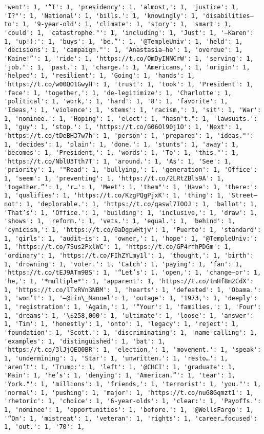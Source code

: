 \documentclass[11pt]{article}
\begin{document}
\begin{Verbatim}[commandchars=\\\{\}]
'went': 1, '“I': 1, 'presidency': 1, 'almost,': 1, 'justice': 1, 'I?"': 1, 'National': 1, 'bills.': 1, 'knowingly': 1, 'disabilities—to': 1, '9-year-old': 1, 'climate': 1, 'story': 1, 'smart': 1, 'could': 1, 'catastrophe."': 1, 'including': 1, 'Just': 1, '—Karen': 1, 'up!):': 1, 'buys': 1, 'be.”': 1, '@TempleUniv': 1, 'held': 1, 'decisions': 1, 'campaign."': 1, 'Anastasia—he': 1, 'overdue': 1, 'Kaine!”': 1, 'ride': 1, 'https://t.co/OmDyINNCrW': 1, 'serving': 1, 'job."': 1, 'past.': 1, 'charge.': 1, 'Americans,': 1, 'origin': 1, 'helped': 1, 'resilient': 1, 'Going': 1, 'hands': 1, 'https://t.co/w00QO1GwyH': 1, 'trust': 1, 'took': 1, 'President': 1, 'face': 1, 'together,': 1, 'de-legitimize': 1, 'Charlotte': 1, 'political': 1, 'work,': 1, 'hard': 1, '8': 1, 'favorite': 1, 'Ideas,': 1, 'violence': 1, 'stems': 1, 'racism,': 1, 'sit': 1, 'War': 1, 'nominee.': 1, 'Hoping': 1, 'elect': 1, "hasn't.": 1, 'lawsuits.': 1, 'guy': 1, 'stop.': 1, 'https://t.co/G06Ol90j1O': 1, 'Next': 1, 'https://t.co/tDeBH37w7h': 1, 'person': 1, 'prepared': 1, 'ideas."': 1, 'decides': 1, 'plain': 1, 'done.': 1, 'stunts': 1, 'away': 1, 'becomes': 1, 'President,': 1, 'words': 1, 'To': 1, 'this."': 1, 'https://t.co/NblU3Tth7T': 1, 'around.': 1, 'As': 1, 'See': 1, 'priority': 1, '"Read': 1, 'bullying,': 1, 'generation': 1, 'Office': 1, 'seem': 1, 'preventing': 1, 'https://t.co/2LRtZBls9A': 1, 'together.”': 1, 'r…': 1, 'Meet': 1, 'them"': 1, 'Have': 1, 'there:': 1, 'qualifies': 1, 'https://t.co/KzgPQgPjxK': 1, 'thing': 1, 'Street—not': 1, 'deplorable.': 1, 'https://t.co/qaswl7IOOJ': 1, 'ballot': 1, 'That’s': 1, 'Office.': 1, 'building': 1, 'inclusive,': 1, 'draw': 1, 'shows': 1, 'reform.': 1, 'vets.': 1, 'equal.': 1, 'behind': 1, 'cynicism,': 1, 'https://t.co/0aDgpwHtjv': 1, 'Puerto': 1, 'standard': 1, 'girls': 1, 'audit—is': 1, 'owner,': 1, 'hope': 1, '@TempleUniv:': 1, 'https://t.co/7Sus2PxlWC': 1, 'https://t.co/GP4rfhPDGm': 1, 'ordinary': 1, 'https://t.co/FIhZYLmy1l': 1, 'thought,': 1, 'birth': 1, 'drowning': 1, 'voter.': 1, 'Catch': 1, 'paying': 1, 'fan': 1, 'https://t.co/tEJ9ATm9BS': 1, '“Let’s': 1, 'open,': 1, 'change—or': 1, 'he,': 1, '*multiple*': 1, 'apparent': 1, 'https://t.co/tmHf8m2CdX': 1, 'https://t.co/lTxRVn3NBM': 1, 'hearts': 1, 'defeated': 1, 'Obama.': 1, 'won’t': 1, '—@Lin\_Manuel': 1, 'outage': 1, '1973,': 1, 'deeply': 1, 'registration': 1, 'Again,': 1, '“Your': 1, 'families.': 1, 'Four': 1, 'dreams': 1, '\$258,000': 1, 'ultimate': 1, 'loose': 1, 'answer': 1, 'Tim': 1, 'honestly': 1, 'onto': 1, 'legacy': 1, 'reject': 1, 'foundation': 1, 'Scott.': 1, 'discriminating': 1, 'name-calling': 1, 'examples': 1, 'distinguished': 1, 'bat': 1, 'https://t.co/3lJjQEQ0BR': 1, 'election,': 1, 'movement.': 1, 'speak': 1, 'undermining': 1, 'Star': 1, 'unwritten.': 1, 'resto…': 1, 'aren’t': 1, 'Trump:': 1, 'left': 1, '@CHCI': 1, 'graduate': 1, 'Main': 1, 'he’s': 1, 'denying': 1, 'American.”': 1, 'tear': 1, 'York."': 1, 'millions': 1, 'friends,': 1, 'terrorist': 1, 'you."': 1, 'normal': 1, 'pushing': 1, 'major': 1, 'https://t.co/nuG8Gqmzt1': 1, 'rhetoric': 1, 'choice': 1, '6-year-olds': 1, 'clear:': 1, 'Payoffs.': 1, 'nominee': 1, 'opportunities': 1, 'before.': 1, '@WellsFargo': 1, '“On': 1, 'mistreat': 1, 'veteran': 1, 'rights': 1, 'career…focused': 1, 'out.': 1, '70': 1, 
\end{Verbatim}
\end{document}
